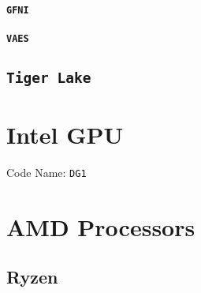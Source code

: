 \documentclass[10pt,conference]{IEEEtran}
\begin{document}
\paragraph{\texttt{GFNI}}

\paragraph{\texttt{VAES}}

\subsection{\texttt{Tiger Lake}}


\section{Intel GPU}
Code Name: \texttt{DG1}\\


\section{AMD Processors}

\subsection{Ryzen}
\end{document}
